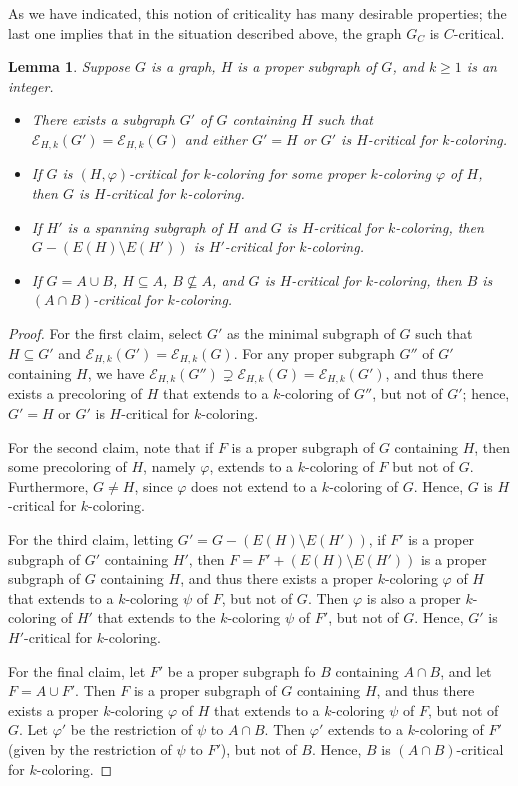 \documentclass[12pt,twoside,openright,a4paper]{book}
\newtheorem{lemma}[theorem]{Lemma}
\newcommand{\EE}{\mathcal{E}}
\begin{document}
As we have indicated, this notion of criticality has many desirable properties; the last one implies that in the
situation described above, the graph $G_C$ is $C$-critical.
\begin{lemma}\label{lemma:critsgprop}
Suppose $G$ is a graph, $H$ is a proper subgraph of $G$, and $k\ge 1$ is an integer.
\begin{itemize}
\item There exists a subgraph $G'$ of $G$ containing $H$ such that $\EE_{H,k}(G')=\EE_{H,k}(G)$
and either $G'=H$ or $G'$ is $H$-critical for $k$-coloring.
\item If $G$ is $(H,\varphi)$-critical for $k$-coloring for some proper $k$-coloring $\varphi$ of $H$,
then $G$ is $H$-critical for $k$-coloring.
\item If $H'$ is a spanning subgraph of $H$ and $G$ is $H$-critical for $k$-coloring, then $G-(E(H)\setminus E(H'))$ is
$H'$-critical for $k$-coloring.
\item If $G=A\cup B$, $H\subseteq A$, $B\not\subseteq A$, and $G$ is $H$-critical for $k$-coloring,
then $B$ is $(A\cap B)$-critical for $k$-coloring.
\end{itemize}
\end{lemma}
\begin{proof}
For the first claim, select $G'$ as the minimal subgraph of $G$ such that $H\subseteq G'$ and $\EE_{H,k}(G')=\EE_{H,k}(G)$.
For any proper subgraph $G''$ of $G'$ containing $H$, we have $\EE_{H,k}(G'')\supsetneq \EE_{H,k}(G)=\EE_{H,k}(G')$, and thus there
exists a precoloring of $H$ that extends to a $k$-coloring of $G''$, but not of $G'$; hence, $G'=H$ or $G'$ is $H$-critical for $k$-coloring.

For the second claim, note that if $F$ is a proper subgraph of $G$ containing $H$, then some precoloring of $H$, namely $\varphi$,
extends to a $k$-coloring of $F$ but not of $G$. Furthermore, $G\neq H$, since $\varphi$ does not extend to a $k$-coloring of $G$.  Hence, $G$
is $H$-critical for $k$-coloring.

For the third claim, letting $G'=G-(E(H)\setminus E(H'))$, if $F'$ is a proper subgraph of $G'$ containing $H'$,
then $F=F'+(E(H)\setminus E(H'))$ is a proper subgraph of $G$ containing $H$, and thus there exists a proper $k$-coloring $\varphi$
of $H$ that extends to a $k$-coloring $\psi$ of $F$, but not of $G$.  Then $\varphi$ is also a proper $k$-coloring of $H'$ that
extends to the $k$-coloring $\psi$ of $F'$, but not of $G$.  Hence, $G'$ is $H'$-critical for $k$-coloring.

For the final claim, let $F'$ be a proper subgraph fo $B$ containing $A\cap B$, and let $F=A\cup F'$.  Then $F$ is a proper
subgraph of $G$ containing $H$, and thus there exists a proper $k$-coloring $\varphi$
of $H$ that extends to a $k$-coloring $\psi$ of $F$, but not of $G$.  Let $\varphi'$ be the restriction of $\psi$ to
$A\cap B$.  Then $\varphi'$ extends to a $k$-coloring of $F'$ (given by the restriction of $\psi$ to $F'$), but not of $B$.
Hence, $B$ is $(A\cap B)$-critical for $k$-coloring.
\end{proof}
\end{document}
